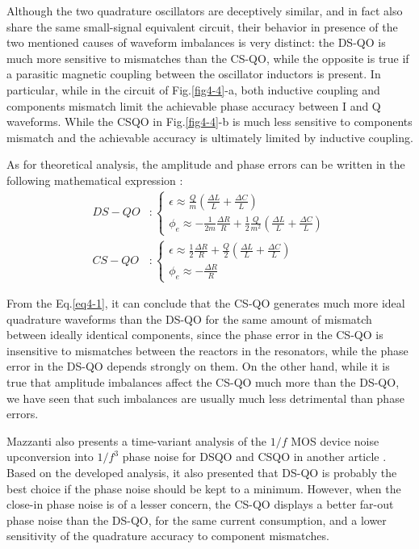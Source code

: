 \documentclass[conference]{IEEEtran}
\begin{document}
Although the two quadrature oscillators are deceptively similar, and in fact also share the same small-signal equivalent circuit, their behavior in presence of the two mentioned causes of waveform imbalances is very distinct: the DS-QO is much more sensitive to mismatches than the CS-QO, while the opposite is true if a parasitic magnetic coupling between the oscillator inductors is present. In particular, while in the circuit of Fig.\ref{fig4-4}-a, both inductive coupling and components mismatch limit the achievable phase accuracy between I and Q waveforms. While the CSQO in Fig.\ref{fig4-4}-b is much less sensitive to components mismatch and the achievable accuracy is ultimately limited by inductive coupling. 

As for theoretical analysis, the amplitude and phase errors can be written in the following mathematical expression \cite{b8}:
\begin{equation}
\begin{aligned}
DS-QO &: 
\begin{cases}
\epsilon\approx\frac{Q}{m}(\frac{\Delta L}{L}+\frac{\Delta C}{L}) \\
\phi_e\approx-\frac{1}{2m}\frac{\Delta R}{R}+\frac{1}{2}\frac{Q}{m^2}(\frac{\Delta L}{L}+\frac{\Delta C}{L})
\end{cases}\\
CS-QO &: 
\begin{cases}
\epsilon\approx\frac{1}{2}\frac{\Delta R}{R}+\frac{Q}{2}(\frac{\Delta L}{L}+\frac{\Delta C}{L}) \\
\phi_e\approx-\frac{\Delta R}{R}
\end{cases}
\end{aligned}
\label{eq4-1}
\end{equation}

From the Eq.\ref{eq4-1}, it can conclude that the CS-QO generates much more ideal quadrature waveforms than the DS-QO for the same amount of mismatch between ideally identical components, since the phase error in the CS-QO is insensitive to mismatches between the reactors in the resonators, while the phase error in the DS-QO depends strongly on them. On the other hand, while it is true that amplitude imbalances affect the CS-QO much more than the DS-QO, we have seen that such imbalances are usually much less detrimental than phase errors.

Mazzanti also presents a time-variant analysis of the $1/f$ MOS device noise upconversion into $1/f^3$ phase noise for DSQO and CSQO in another article \cite{b9}. Based on the developed analysis, it also presented that DS-QO is probably the best choice if the phase noise should be kept to a minimum. However, when the close-in phase noise is of a lesser concern, the CS-QO displays a better far-out phase noise than the DS-QO, for the same current consumption, and a lower sensitivity of the quadrature accuracy to component mismatches.
\end{document}
